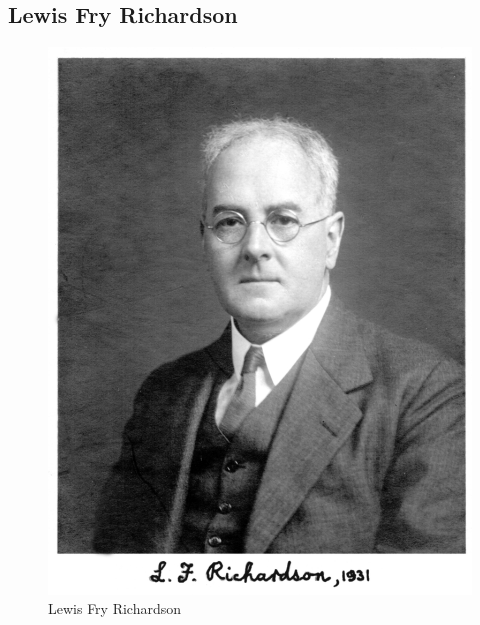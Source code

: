 \begin{refsection}
\subsection{Lewis Fry Richardson
\label{subsection:klima:richardson}}

\begin{figure}
\centering
\includegraphics{klima/richardson.jpg}
\caption{Lewis Fry Richardson \cite{klima:biography}
\label{klima:geschichte:richardson}}
\end{figure}


\end{refsection}
